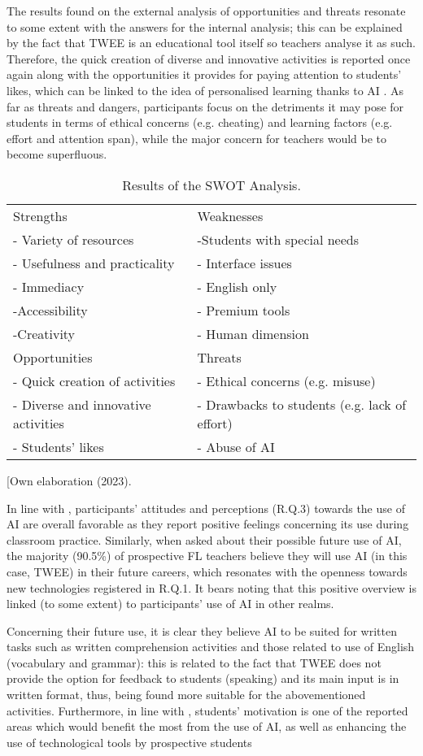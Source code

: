 The results found on the external analysis of opportunities and threats
resonate to some extent with the answers for the internal analysis; this
can be explained by the fact that TWEE is an educational tool itself so
teachers analyse it as such. Therefore, the quick creation of diverse
and innovative activities is reported once again along with the
opportunities it provides for paying attention to students' likes, which
can be linked to the idea of personalised learning thanks to AI \cite{chen2020}. As far as threats and dangers, participants focus on the
detriments it may pose for students in terms of ethical concerns (e.g.
cheating) and learning factors (e.g. effort and attention span), while
the major concern for teachers would be to become superfluous.


\begin{table}[!htbp]
\centering
\caption{Results of the SWOT Analysis.}
\label{tab-02}
\begin{tabular}{ll}
\toprule
Strengths & Weaknesses\\
- Variety of resources & -Students with special needs\\
- Usefulness and practicality & - Interface issues\\
- Immediacy & - English only\\
-Accessibility & - Premium tools\\
-Creativity & - Human dimension\\
\midrule
Opportunities & Threats\\
- Quick creation of activities & - Ethical concerns (e.g. misuse)\\
- Diverse and innovative activities & - Drawbacks to students (e.g. lack of effort)\\
- Students’ likes & - Abuse of AI\\
\bottomrule
\end{tabular}
\source[Own elaboration (2023).
\end{table}


In line with \textcite{hartono2023}, participants' attitudes and
perceptions (R.Q.3) towards the use of AI are overall favorable as they
report positive feelings concerning its use during classroom practice.
Similarly, when asked about their possible future use of AI, the
majority (90.5\%) of prospective FL teachers believe they will use AI
(in this case, TWEE) in their future careers, which resonates with the
openness towards new technologies registered in R.Q.1. It bears noting
that this positive overview is linked (to some extent) to participants'
use of AI in other realms.

Concerning their future use, it is clear they believe AI to be suited
for written tasks such as written comprehension activities and those
related to use of English (vocabulary and grammar): this is related to
the fact that TWEE does not provide the option for feedback to students
(speaking) and its main input is in written format, thus, being found
more suitable for the abovementioned activities. Furthermore, in line
with \textcite{yang2022}, students' motivation is one of the reported areas
which would benefit the most from the use of AI, as well as enhancing
the use of technological tools by prospective students